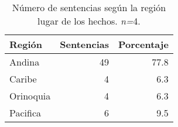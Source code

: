 \begin{table}[!htbp]
\centering
\caption{Número de sentencias según la región lugar de los hechos. \textit{n=}4.} 
\label{tab:reghec}
\begin{tabular}{lrr}
  \hline
Región & Sentencias & Porcentaje \\ 
  \hline
Andina & 49 & 77.8 \\ 
  Caribe &  4 & 6.3 \\ 
  Orinoquia &  4 & 6.3 \\ 
  Pacifica &  6 & 9.5 \\ 
   \hline
\end{tabular}
\end{table}
